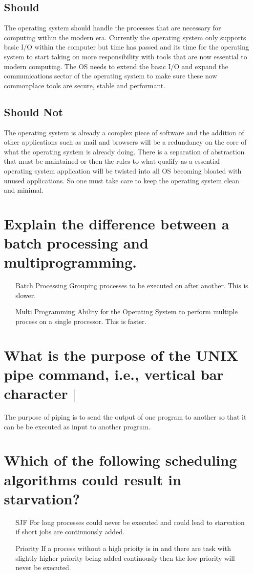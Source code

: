\documentclass{article}
\begin{document}
\subsection*{Should}
The operating system should handle the processes that are necessary for computing within the modern era. Currently the operating system only supports basic I/O within the computer but time has passed and its time for the operating system to start taking on more responsibility with tools that are now essential to modern computing. The OS needs to extend the basic I/O and expand the communications sector of the operating system to make sure these now commonplace tools are secure, stable and performant. 
\subsection*{Should Not}
The operating system is already a complex piece of software and the addition of other applications such as mail and browsers will be a redundancy on the core of what the operating system is already doing. There is a separation of abstraction that must be maintained or then the rules to what qualify as a essential operating system application will be twisted into all OS becoming bloated with unused applications. So one must take care to keep the operating system clean and minimal. 
\section{Explain the difference between a batch processing and multiprogramming.}
\begin{itemize}
	\item [Batch Processing] Grouping processes to be executed on after another. This is slower.
	\item [Multi Programming] Ability for the Operating System to perform multiple process on a single processor. This is faster.
\end{itemize}
\section{What is the purpose of the UNIX pipe command, i.e., vertical bar character \(|\)}
The purpose of piping is to send the output of one program to another so that it can be be executed as input to another program.
\section{Which of the following scheduling algorithms could result in starvation?}
\begin{itemize}
	\item [SJF] For long processes could never be executed and could lead to starvation if short jobs are continuously added.
	\item [Priority] If a process without a high prioity is in and there are task with slightly higher priority being added continously then the low priority will never be executed.
\end{itemize}
\end{document}
